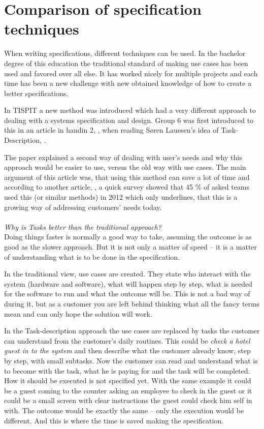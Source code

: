 \documentclass[Main]{subfiles}
\begin{document}
\section{Comparison of specification techniques}


When writing specifications, different techniques can be used.
In the bachelor degree of this education the traditional standard of making use cases has been used and favored over all else.
It has worked nicely for multiple projects and each time has been a new challenge with new obtained knowledge of how to create a better specifications.

In TISPIT a new method was introduced  which had a very different approach to dealing with a systems specification and design.
Group 6 was first introduced to this in an article in handin 2, \parencite[]{HI2}, when reading Søren Lauesen's idea of Task-Description, \parencite[]{Task}.

The paper explained a second way of dealing with user's needs and why this approach would be easier to use, versus the old way with use cases.
The main argument of this article was, that using this method can save a lot of time and according to another article, \parencite[]{Task2}, a quick survey showed that 45 \% of asked teams used this (or similar methods) in 2012 which only underlines, that this is a growing way of addressing customers' needs today.
\\
\\
\textit{Why is Tasks better than the traditional approach?}
\\
Doing things faster is normally a good way to take, assuming the outcome is as good as the slower approach.
But it is not only a matter of speed -- it is a matter of understanding what is to be done in the specification.

In the traditional view, use cases are created.
They state who interact with the system (hardware and software), what will happen step by step, what is needed for the software to run and what the outcome will be.
This is not a bad way of during it, but as a customer you are left behind thinking what all the fancy terms mean and can only hope the solution will work.

In the Task-description approach the use cases are replaced by tasks the customer can understand from the customer's daily routines.
This could be \textit{check a hotel guest in to the system} and then describe what the customer already know, step by step, with small subtasks.
Now the customer can read and understand what is to become with the task, what he is paying for and the task will be completed.
How it should be executed is not specified yet.
With the same example it could be a guest coming to the counter asking an employee to check in the guest or it could be a small screen with clear instructions the guest could check him self in with.
The outcome would be exactly the same -- only the execution would be different.
And this is where the time is saved making the specification.
\end{document}
